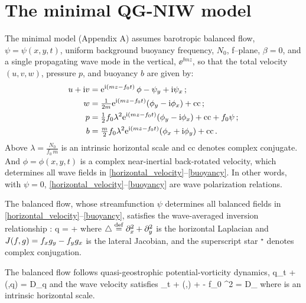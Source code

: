 \documentclass{jfm}
\begin{document}
\section{The \cite{xie_vanneste2015} minimal QG-NIW model}
The \cite{xie_vanneste2015} minimal model (Appendix A) assumes
barotropic balanced flow, $\psi=\psi(x,y,t)$,
uniform background buoyancy frequency, $N_0$, f--plane, $\beta=0$, and a single
propagating wave mode in the vertical, $\ee^{\ii m z}$, so that the
total velocity $(u,v,w)$, pressure $p$, and buoyancy $b$ are given by:
\begin{align}
\label{horizontal_velocity}
u + {\rm i} v  &= {\rm e}^{{\rm i} (m z - f_0 t)}\,\phi -\psi_y + {\rm i}\psi_x\,;\\
  \label{vertical_velocity}
  w &= \tfrac{1}{2 m}{\rm e}^{{\rm i} (m z - f_0 t)}(\phi_y-{\rm i}\phi_x)  + \text{cc}  \,;\\
\label{pressure}
\qquad p &= \tfrac{1}{2} f_0\lambda^2{\rm e}^{{\rm i} (m z - f_0 t)}(\phi_y-{\rm i}\phi_x)
+\text{cc} + f_0 \psi \,;\\
\label{buoyancy}
b &=  \tfrac{m}{2} f_0\lambda^2{\rm e}^{{\rm i} (m z - f_0 t)}(\phi_x+{\rm i}\phi_y) + \text{cc}
  \, .
\end{align}
Above $\lambda = \tfrac{N_0}{f_0\, m}$ is an intrinsic horizontal scale and cc denotes
complex conjugate. And $\phi = \phi(x,y,t)$ is a complex near-inertial back-rotated velocity,
which determines all wave fields in \eqref{horizontal_velocity}--\eqref{buoyancy}.
In other words, with $\psi=0$, \eqref{horizontal_velocity}--\eqref{buoyancy}
are wave polarization relations.

The balanced flow,
whose streamfunction $\psi$ determines all balanced fields in
\eqref{horizontal_velocity}--\eqref{buoyancy}, satisfies the
wave-averaged inversion relationship
\citep[cf. ][]{wagner_young2015}:
\beq
\label{qgpv}
q = \lap \psi +
                 \com
\eeq
where $\triangle \stackrel{\mathrm{def}}{=} \partial_x^2 + \partial_y^2$ is the horizontal
Laplacian and $J(f,g)=f_x g_y - f_y g_x$ is the lateral Jacobian, and
the superscript star $^\star$ denotes complex conjugation.

The balanced flow follows quasi-geostrophic potential-vorticity dynamics,
\beq
\label{macroturb}
q_t + \sJ(\psi,q) = D_q\com
\eeq
and the wave velocity satisfies
\beq
\label{waves}
\phi_t + \sJ(\psi,\phi) + \phi\lap \psi -  f_0 \lambda^2 \lap \phi
 = D_\phi\com
\eeq
where   is an intrinsic horizontal scale.
\end{document}
